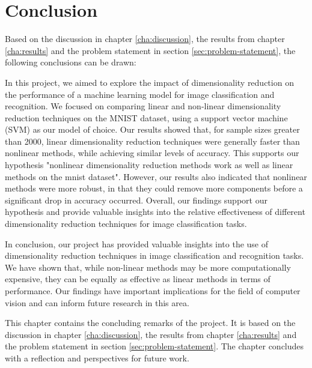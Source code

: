 \chapter{Conclusion}\label{cha:conclusion}
Based on the discussion in chapter \ref{cha:discussion}, the results from chapter \ref{cha:results} and the problem statement in section \ref{sec:problem-statement}, the following conclusions can be drawn:


In this project, we aimed to explore the impact of dimensionality reduction on the performance of a machine learning model for image classification and recognition. We focused on comparing linear and non-linear dimensionality reduction techniques on the MNIST dataset, using a support vector machine (SVM) as our model of choice. Our results showed that, for sample sizes greater than 2000, linear dimensionality reduction techniques were generally faster than nonlinear methods, while achieving similar levels of accuracy. This supports our hypothesis "nonlinear dimensionality reduction methods work as well as linear methods on the \gls{mnist} dataset". However, our results also indicated that nonlinear methods were more robust, in that they could remove more components before a significant drop in accuracy occurred. Overall, our findings support our hypothesis and provide valuable insights into the relative effectiveness of different dimensionality reduction techniques for image classification tasks.

In conclusion, our project has provided valuable insights into the use of dimensionality reduction techniques in image classification and recognition tasks. We have shown that, while non-linear methods may be more computationally expensive, they can be equally as effective as linear methods in terms of performance. Our findings have important implications for the field of computer vision and can inform future research in this area.

This chapter contains the concluding remarks of the project. It is based on the discussion in chapter \ref{cha:discussion}, the results from chapter \ref{cha:results} and the problem statement in section \ref{sec:problem-statement}. The chapter concludes with a reflection and perspectives for future work.